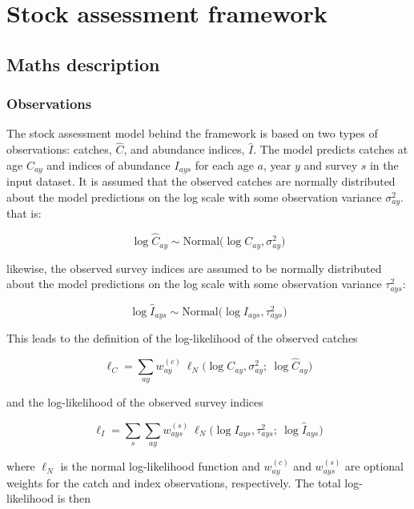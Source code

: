 \documentclass[
]{book}
\begin{document}
\hypertarget{stock-assessment-framework}{%
\chapter{Stock assessment framework}\label{stock-assessment-framework}}

\hypertarget{maths-description}{%
\section{\texorpdfstring{Maths description \label{sec:math}}{Maths description }}\label{maths-description}}

\hypertarget{observations}{%
\subsection{Observations}\label{observations}}

The stock assessment model behind the framework is based on two types of observations: catches, \(\hat{C}\), and abundance indices, \(\hat{I}\). The model predicts catches at age \(C_{ay}\) and indices of abundance \(I_{ays}\) for each age \(a\), year \(y\) and survey \(s\) in the input dataset. It is assumed that the observed catches are normally distributed about the model predictions on the log scale with some observation variance \(\sigma^2_{ay}\). that is:

\[\log \hat{C}_{ay} \sim \text{Normal} \Big( \log C_{ay}, \sigma^2_{ay}\Big)\]

likewise, the observed survey indices are assumed to be normally distributed about the model predictions on the log scale with some observation variance \(\tau^2_{ays}\):

\[\log \hat{I}_{ays} \sim \text{Normal} \Big( \log I_{ays}, \tau^2_{ays} \Big)\]

This leads to the definition of the log-likelihood of the observed catches

\[\ell_C = \sum_{ay} w^{(c)}_{ay}\ \ell_N \Big( \log C_{ay}, \sigma^2_{ay} ;\ \log \hat{C}_{ay} \Big)\]

and the log-likelihood of the observed survey indices

\[\ell_I = \sum_s \sum_{ay} w^{(s)}_{ays}\ \ell_N \Big( \log I_{ays}, \tau_{ays}^2 ;\ \log \hat{I}_{ays} \Big)\]

where \(\ell_N\) is the normal log-likelihood function and \(w^{(c)}_{ay}\) and \(w^{(s)}_{ays}\) are optional weights for the catch and index observations, respectively. The total log-likelihood is then
\end{document}

